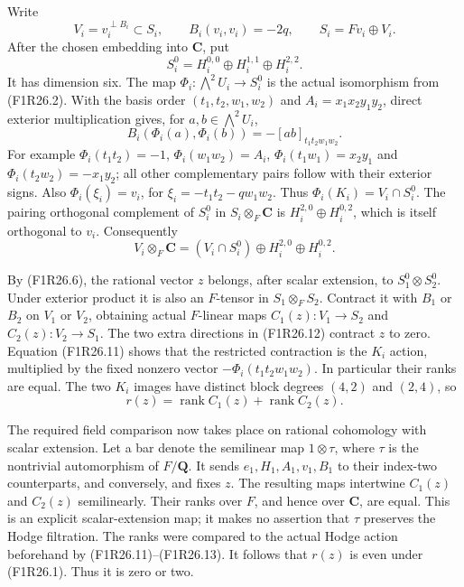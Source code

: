 Write
\[
           V_i=v_i^{\perp B_i}\subset S_i,\qquad
           B_i(v_i,v_i)=-2q,\qquad
           S_i=Fv_i\oplus V_i.
 \tag{F1R26.9}
\]
After the chosen embedding into $\mathbf C$, put
\[
 S_i^0=H^{0,0}_i\oplus H^{1,1}_i\oplus H^{2,2}_i.
 \tag{F1R26.10}
\]
It has dimension six. The map
$\Phi_i:\bigwedge^2U_i\to S_i^0$ is the actual
isomorphism from (F1R26.2).
With the basis order $(t_1,t_2,w_1,w_2)$ and
$A_i=x_1x_2y_1y_2$, direct exterior multiplication
gives, for $a,b\in\bigwedge^2U_i$,
\[
          B_i(\Phi_i(a),\Phi_i(b))
                   =-[ab]_{t_1t_2w_1w_2}.
 \tag{F1R26.11}
\]
For example $\Phi_i(t_1t_2)=-1$,
$\Phi_i(w_1w_2)=A_i$,
$\Phi_i(t_1w_1)=x_2y_1$ and
$\Phi_i(t_2w_2)=-x_1y_2$; all other complementary
pairs follow with their exterior signs.
Also $\Phi_i(\xi_i)=v_i$, for
$\xi_i=-t_1t_2-qw_1w_2$.
Thus $\Phi_i(K_i)=V_i\cap S_i^0$.
The pairing orthogonal complement of $S_i^0$
in $S_i\otimes_F\mathbf C$ is
$H^{2,0}_i\oplus H^{0,2}_i$, which is itself
orthogonal to $v_i$. Consequently
\[
 V_i\otimes_F\mathbf C
      =(V_i\cap S_i^0)\oplus H^{2,0}_i\oplus H^{0,2}_i.
 \tag{F1R26.12}
\]

By (F1R26.6), the rational vector $z$ belongs,
after scalar extension, to $S_1^0\otimes S_2^0$.
Under exterior product it is also an $F$-tensor
in $S_1\otimes_FS_2$.
Contract it with $B_1$ or $B_2$ on $V_1$ or
$V_2$, obtaining actual $F$-linear maps
$C_1(z):V_1\to S_2$ and $C_2(z):V_2\to S_1$.
The two extra directions in (F1R26.12) contract
$z$ to zero. Equation (F1R26.11) shows that
the restricted contraction is the $K_i$ action,
multiplied by the fixed nonzero vector
$-\Phi_i(t_1t_2w_1w_2)$. In particular their ranks
are equal. The two $K_i$ images have distinct
block degrees $(4,2)$ and $(2,4)$, so
\[
                          r(z)=\operatorname{rank}C_1(z)
                                      +\operatorname{rank}C_2(z).
 \tag{F1R26.13}
\]

The required field comparison now takes place
on rational cohomology with scalar extension.
Let a bar denote the semilinear map
$1\otimes\tau$, where $\tau$ is the nontrivial
automorphism of $F/\mathbf Q$.
It sends $e_1,H_1,A_1,v_1,B_1$ to their
index-two counterparts, and conversely, and
fixes $z$. The resulting maps intertwine
$C_1(z)$ and $C_2(z)$ semilinearly.
Their ranks over $F$, and hence over $\mathbf C$,
are equal. This is an explicit scalar-extension
map; it makes no assertion that $\tau$ preserves
the Hodge filtration. The ranks were compared
to the actual Hodge action beforehand by
(F1R26.11)--(F1R26.13).
It follows that $r(z)$ is even under (F1R26.1).
Thus it is zero or two.

